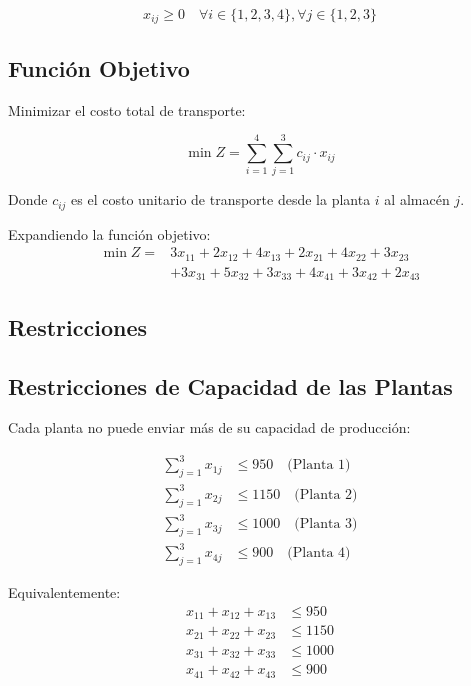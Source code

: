 \documentclass[12pt, a4paper, oneside]{book}
\theoremstyle{definition}
\begin{document}
    $$x_{ij} \geq 0 \quad \forall i \in \{1,2,3,4\}, \forall j \in \{1,2,3\}$$

    \subsection{Función Objetivo}

    Minimizar el costo total de transporte:

    $$\min Z = \sum_{i=1}^{4} \sum_{j=1}^{3} c_{ij} \cdot x_{ij}$$

    Donde $c_{ij}$ es el costo unitario de transporte desde la planta $i$ al almacén $j$.

    Expandiendo la función objetivo:
    \begin{align}
    \min Z = &3x_{11} + 2x_{12} + 4x_{13} + 2x_{21} + 4x_{22} + 3x_{23} \nonumber \\
    &+ 3x_{31} + 5x_{32} + 3x_{33} + 4x_{41} + 3x_{42} + 2x_{43}
    \end{align}

    \subsection{Restricciones}

    \subsection{Restricciones de Capacidad de las Plantas}
    Cada planta no puede enviar más de su capacidad de producción:

    \begin{align}
    \sum_{j=1}^{3} x_{1j} &\leq 950 \quad \text{(Planta 1)} \\
    \sum_{j=1}^{3} x_{2j} &\leq 1150 \quad \text{(Planta 2)} \\
    \sum_{j=1}^{3} x_{3j} &\leq 1000 \quad \text{(Planta 3)} \\
    \sum_{j=1}^{3} x_{4j} &\leq 900 \quad \text{(Planta 4)}
    \end{align}

    Equivalentemente:
    \begin{align}
    x_{11} + x_{12} + x_{13} &\leq 950 \\
    x_{21} + x_{22} + x_{23} &\leq 1150 \\
    x_{31} + x_{32} + x_{33} &\leq 1000 \\
    x_{41} + x_{42} + x_{43} &\leq 900
    \end{align}
\end{document}
